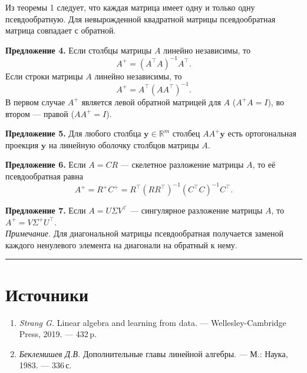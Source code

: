 \documentclass[11pt,a4paper]{article}
\providecommand{\tightlist}{%
      \setlength{\itemsep}{0pt}\setlength{\parskip}{0pt}}
\begin{document}
Из теоремы 1 следует, что каждая матрица имеет одну и только одну
псевдообратную. Для невырожденной квадратной матрицы псевдообратная
матрица совпадает с обратной.

\textbf{Предложение 4.} Если столбцы матрицы \(A\) линейно независимы,
то \[
  A^+ = (A^\top A)^{-1} A^\top.
\] Если строки матрицы \(A\) линейно независимы, то \[
  A^+ = A^\top (A A^\top)^{-1}.
\] В первом случае \(A^+\) является левой обратной матрицей для \(A\)
(\(A^+A=I\)), во втором --- правой (\(A A^+ = I\)).

\textbf{Предложение 5.} Для любого столбца
\(\mathbf{y} \in \mathbb{R}^m\) столбец \(A A^+ \mathbf{y}\) есть
ортогональная проекция \(\mathbf{y}\) на линейную оболочку столбцов
матрицы \(A\).

\textbf{Предложение 6.} Если \(A = CR\) --- скелетное разложение матрицы
\(A\), то её псевдообратная равна \[
  A^+ = R^+ C^+ = R^\top (R R^\top)^{-1} (C^\top C)^{-1} C^\top.
\]

\textbf{Предложение 7.} Если \(A = U \Sigma V^\top\) --- сингулярное
разложение матрицы \(A\), то \(A^+ = V \Sigma^+ U^\top\).\\
\emph{Примечание.} Для диагональной матрицы псевдообратная получается
заменой каждого ненулевого элемента на диагонали на обратный к нему.

    \begin{center}\rule{0.5\linewidth}{0.5pt}\end{center}

    \hypertarget{ux438ux441ux442ux43eux447ux43dux438ux43aux438}{%
\section{Источники}\label{ux438ux441ux442ux43eux447ux43dux438ux43aux438}}

\begin{enumerate}
\def\labelenumi{\arabic{enumi}.}
\tightlist
\item
  \emph{Strang G.} Linear algebra and learning from data. ---
  Wellesley-Cambridge Press, 2019. --- 432\,p.
\item
  \emph{Беклемишев Д.В.} Дополнительные главы линейной алгебры. --- М.:
  Наука, 1983. --- 336\,с.
\end{enumerate}



\end{document}
